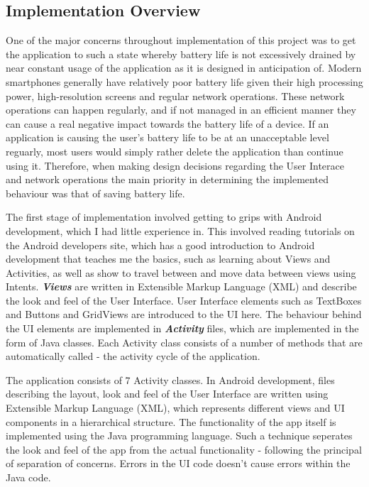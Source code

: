 \documentclass{l4proj}
\begin{document}
\subsection{Implementation Overview}

One of the major concerns throughout implementation of this project was to get the application to such a state whereby battery life is not excessively drained by  near constant usage of the application as it is designed in anticipation of. Modern smartphones generally have relatively poor battery life given their high processing power, high-resolution screens and regular network operations. These network operations can happen regularly, and if not managed in an efficient manner  they can cause a real negative impact towards the battery life of a device. If an application is causing the user's battery life to be at an unacceptable level reguarly, most users would simply rather delete the application than continue using it. Therefore, when making design decisions regarding the User Interace and network operations the main priority in determining the implemented behaviour was that of saving battery life.

The first stage of implementation involved getting to grips with Android development, which I had little experience in. This involved reading tutorials on the Android developers site, which has a good introduction to Android development that teaches me the basics, such as learning about Views and Activities, as well as show to travel between and move data between views using Intents. \textbf{\textit{Views}} are written in Extensible Markup Language (XML) and describe the look and feel of the User Interface. User Interface elements such as TextBoxes and Buttons and GridViews are introduced to the UI here. The behaviour behind the UI elements are implemented in \textbf{\textit{Activity}} files, which are implemented in the form of Java classes. Each Activity class consists of a number of methods that are automatically called - the activity cycle of the application.

The application consists of 7 Activity classes. In Android development, files describing the layout, look and feel of the User Interface are written using Extensible Markup Language (XML), which represents different views and UI components in a hierarchical structure. The functionality of the app itself is implemented using the Java programming language. Such a technique seperates the look and feel of the app from the actual functionality - following the principal of separation of concerns. Errors in the UI code doesn't cause errors within the Java code.
\end{document}
